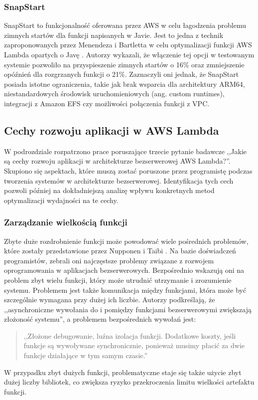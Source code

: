 \subsubsection*{SnapStart}

SnapStart to funkcjonalność oferowana przez AWS w celu łagodzenia problemu zimnych startów dla funkcji napisanych w Javie. 
Jest to jedna z technik zaproponowanych przez Menendeza i Bartletta w celu optymalizacji funkcji AWS Lambda opartych o Javę \cite{menéndez2023performancebestpracticesusing}. 
Autorzy wykazali, że włączenie tej opcji w testowanym systemie pozwoliło na przyspieszenie zimnych startów o 16\% oraz zmniejszenie opóźnień dla rozgrzanych funkcji o 21\%. 
Zaznaczyli oni jednak, że SnapStart posiada istotne ograniczenia, takie jak brak wsparcia dla architektury ARM64, niestandardowych środowisk uruchomieniowych (ang. custom runtimes), integracji z Amazon EFS czy możliwości połączenia funkcji z VPC.

\subsection{Cechy rozwoju aplikacji w AWS Lambda}\label{chapter:przeglad_literatury_wyniki_cechy_rozwoju}

W podrozdziale rozpatrzono prace poruszające trzecie pytanie badawcze ,,Jakie są cechy rozwoju aplikacji w architekturze bezserwerowej AWS Lambda?''.
Skupiono się aspektach, które muszą zostać poruszone przez programistę podczas tworzenia systemów w architekturze bezserwerowej.
Identyfikacja tych cech pozwoli później na dokładniejszą analizę wpływu konkretnych metod optymalizacji wydajności na te cechy.

\subsubsection*{Zarządzanie wielkością funkcji}

Zbyte duże rozdrobnienie funkcji może powodować wiele pośrednich problemów, które zostały przedstawione przez Nupponen i Taibi \cite{9095731}.
Na bazie doświadczeń programistów, zebrali oni najczęstsze problemy związane z rozwojem oprogramowania w aplikacjach bezserwerowych.
Bezpośrednio wskazują oni na problem zbyt wielu funkcji, który może utrudnić utrzymanie i zrozumienie systemu.
Problemem jest także komunikacja między funkcjami, która może być szczególnie wymagana przy dużej ich liczbie. 
Autorzy podkreślają, że ,,asynchroniczne wywołania do i pomiędzy funkcjami bezserwerowymi zwiększają złożoność systemu''\cite{9095731}, 
a problemem bezpośrednich wywołań jest:
\begin{quote}
     ,,Złożone debugowanie, luźna izolacja funkcji. Dodatkowe koszty, jeśli funkcje są wywoływane synchronicznie, ponieważ musimy płacić za dwie funkcje działające w tym samym czasie.''\cite{9095731}
\end{quote}
W przypadku zbyt dużych funkcji, problematyczne staje się także użycie zbyt dużej liczby bibliotek, co zwiększa ryzyko przekroczenia limitu wielkości artefaktu funkcji.

